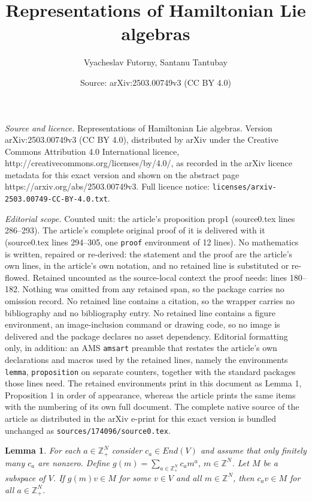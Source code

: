 \documentclass[10pt,a4paper]{amsart}
\title{Representations of Hamiltonian Lie algebras}
\author{Vyacheslav Futorny, Santanu Tantubay}
\date{Source: arXiv:2503.00749v3 (CC BY 4.0)}
\newtheorem{lemma}{Lemma}
\newcommand{\Z}{\mathbb{Z}}
\begin{document}
\maketitle

\noindent\emph{Source and licence.} Representations of Hamiltonian Lie algebras. Version arXiv:2503.00749v3 (CC BY 4.0), distributed by arXiv under the Creative Commons Attribution 4.0 International licence, http://creativecommons.org/licenses/by/4.0/, as recorded in the arXiv licence metadata for this exact version and shown on the abstract page https://arxiv.org/abs/2503.00749v3. Full licence notice: \texttt{licenses/arxiv-2503.00749-CC-BY-4.0.txt}.\par\smallskip

\noindent\textit{Editorial scope.} Counted unit: the article's proposition prop1 (source0.tex lines 286--293). The article's complete original proof of it is delivered with it (source0.tex lines 294--305, one \texttt{proof} environment of 12 lines). No mathematics is written, repaired or re-derived: the statement and the proof are the article's own lines, in the article's own notation, and no retained line is substituted or re-flowed.  Retained uncounted as the source-local context the proof needs: lines 180--182.  Nothing was omitted from any retained span, so the package carries no omission record.  No retained line contains a citation, so the wrapper carries no bibliography and no bibliography entry.  No retained line contains a figure environment, an image-inclusion command or drawing code, so no image is delivered and the package declares no asset dependency.  Editorial formatting only, in addition: an AMS \texttt{amsart} preamble that restates the article's own declarations and macros used by the retained lines, namely the environments \texttt{lemma}, \texttt{proposition} on separate counters, together with the standard packages those lines need.  The retained environments print in this document as Lemma 1, Proposition 1 in order of appearance, whereas the article prints the same items with the numbering of its own full document.  The complete native source of the article as distributed in the arXiv e-print for this exact version is bundled unchanged as \texttt{sources/174096/source0.tex}.
\begin{lemma}\label{la}
   For each $a\in \Z_+^N$ consider $c_a\in End(V)$ and assume that only finitely many $c_a$ are nonzero. Define $g(m)=\sum_{a\in \Z_+^N}c_am^a$,  $m\in \Z^N$. Let $M$ be a subspace of $V$.  If $g(m)v\in M$ for some $v\in V$ and all $m\in \Z^N$, then $c_av\in M$ for all $a\in \Z_+^N$. 
\end{lemma}
\end{document}
